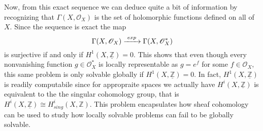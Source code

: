 \documentclass[psamsfonts]{amsart}
\theoremstyle{definition}
\theoremstyle{remark}
\numberwithin{equation}{section}
\begin{document}
  Now, from this exact sequence we can deduce quite a bit of information by recognizing that $\Gamma(X,\mathscr{O}_X)$ is the set of holomorphic functions defined on all of $X.$ Since the sequence is exact the map 
  \[\Gamma(X,\mathscr{O}_X) 
  \xrightarrow{ \hspace{.1cm} exp \hspace{.1cm}} 
  \Gamma(X,\mathscr{O}_X^*)\] 
  is surjective if and only if $H^1(X,\underline{\mathbb{Z}}) = 0.$ This shows that even though every nonvanishing function $g \in \mathscr{O}_X^*$ is locally representable as $g = e^f$ for some $f \in \mathscr{O}_X,$ this same problem is only solvable globally if $H^1(X,\underline{\mathbb{Z}}) = 0.$ In fact, $H^1(X,\underline{\mathbb{Z}})$ is readily computabile since for appropraite spaces we actually have $H^i(X,\underline{\mathbb{Z}})$ is equivalent to the the singular cohomology group, that is $H^i(X,\underline{\mathbb{Z}}) \cong H_{sing}^i(X, \mathbb{Z}).$ \cite{cuboulder} This problem encapsulates how sheaf cohomology can be used to study how locally solvable problems can fail to be globally solvable.






\nocite{wiki_Sheaf_Cohomology}
\end{document}
